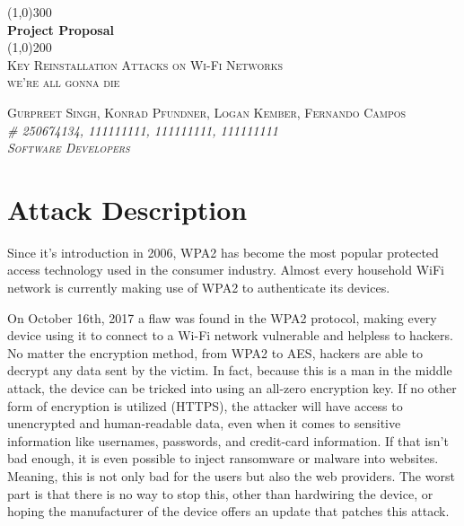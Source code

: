 \documentclass[11pt,]{article}
\begin{document}
\doublespacing

\begin{titlepage}
    \begin{center}
    \line(1,0){300} \\ 
    [0.25in]
    \huge{\bfseries Project Proposal} \\
    [2mm]
    \line(1,0){200} \\
    [1.5cm] 
    \textsc{\Large Key Reinstallation Attacks on Wi-Fi Networks} \\
    [0.75cm]
    \textsc{\Large we're all gonna die} \\
    [10cm]
    \end{center}
    
    \begin{flushright}
    \textsc{\Large{Gurpreet Singh, Konrad Pfundner, Logan Kember, Fernando Campos \\} \normalsize\emph{\# 250674134, 111111111, 111111111, 111111111 \\} \normalsize\emph{Software Developers \\} }
    
    \end{flushright}
    
\end{titlepage}


\newpage

{
\hypersetup{linkcolor=black}
\setcounter{tocdepth}{2}
\tableofcontents
\newpage
}
\section{Attack Description}\label{attack-description}

Since it's introduction in 2006, WPA2 has become the most popular
protected access technology used in the consumer industry. Almost every
household WiFi network is currently making use of WPA2 to authenticate
its devices. \citet{KrackAttacks}

On October 16th, 2017 a flaw was found in the WPA2 protocol, making
every device using it to connect to a Wi-Fi network vulnerable and
helpless to hackers. No matter the encryption method, from WPA2 to AES,
hackers are able to decrypt any data sent by the victim. In fact,
because this is a man in the middle attack, the device can be tricked
into using an all-zero encryption key. If no other form of encryption is
utilized (HTTPS), the attacker will have access to unencrypted and
human-readable data, even when it comes to sensitive information like
usernames, passwords, and credit-card information. If that isn't bad
enough, it is even possible to inject ransomware or malware into
websites. Meaning, this is not only bad for the users but also the web
providers. The worst part is that there is no way to stop this, other
than hardwiring the device, or hoping the manufacturer of the device
offers an update that patches this attack.
\end{document}
